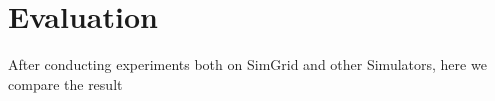 \chapter{Evaluation}
\label{chapter:evaluation}

After conducting experiments both on SimGrid and other Simulators, here we compare the result\\
 
